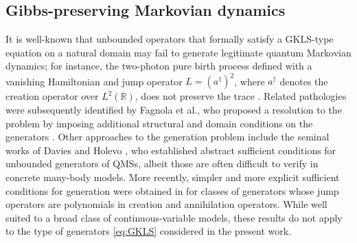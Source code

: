 \documentclass[11pt]{amsart}
\newcommand{\1}{\mathbbm{1}}
\theoremstyle{plain}
\theoremstyle{definition}
\theoremstyle{remark}
\numberwithin{equation}{section}
\begin{document}
\smallskip

 \subsection{Gibbs-preserving Markovian dynamics}\label{sec:GibbsMarkovintro}
 
\noindent  It is well-known that unbounded operators that formally satisfy a GKLS-type equation on a natural domain may fail to generate legitimate quantum Markovian dynamics; for instance, the two-photon pure birth process defined with a vanishing Hamiltonian and jump operator $L=(a^\dagger)^2$, where $a^\dagger$ denotes the creation operator over $L^2(\mathbb{R})$, does not preserve the trace \cite[Example~3.3]{chebotarev2000sufficient}. Related pathologies were subsequently identified by Fagnola et al., who proposed a resolution to the problem by imposing additional structural and domain conditions on the generators \cite{fagnola1999quantum,fagnola2000characterization,fagnola2001generators}.
Other approaches to the generation problem include the seminal works of Davies \cite{Davies1977,davies1976quantum,davies1977generator} and Holevo \cite{holevo1993generators,holevo1996quantum}, who established abstract sufficient conditions for unbounded generators of QMSs, albeit those are often difficult to verify in concrete many-body models. More recently, simpler and more explicit sufficient conditions for generation were obtained in \cite{gondolf2024energy} for classes of generators whose jump operators are polynomials in creation and annihilation operators. While well suited to a broad class of continuous-variable models, these results do not apply to the type of generators \eqref{eq:GKLS} considered in the present work. 
\end{document}
